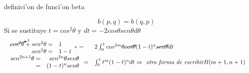 \documentclass{article}
\theoremstyle{definition}
\begin{document}
\begin{center}
\fbox{\begin{minipage}{15em}
  \[b(p,q)=\frac{\Gamma (q)\Gamma (p)}{\Gamma (q+p)}\]
\end{minipage}} definici'on de funci'on beta
\end{center}
\[b(p,q)=b(q,p)\]
Si se sustituye $t=cos^2\theta$ y $dt=-2cos\theta sen\theta d\theta$
\[
\begin{array}{ll}
	\begin{array}{rl}
		\cancelto{t}{cos^2\theta}+sen^2\theta=&1\\
		sen^2\theta =&1-t
	\end{array} \textcolor{red}{\star}= & 2\int^{1}_0 cos^{2m}\theta\cancel{cos\theta} (1-t)^n\cancel{sen\theta}dt\\
	\begin{array}{rr}
		sen^{2n+1}\theta=&sen^{2n}\theta sen\theta\\
		=&(1-t)^n sen\theta
	\end{array} = & \int^{1}_0 t^m (1-t)^n dt\Rightarrow \textit{ otra forma de escribir} B(m+1,n+1)
\end{array}
\]
\end{document}

